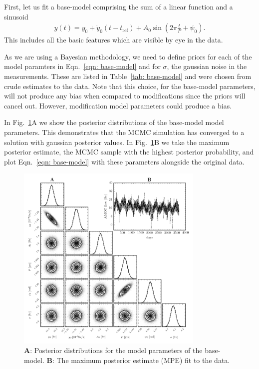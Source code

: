 \documentclass{article}
\newcommand{\tref}{t_{\textrm{ref}}}
\begin{document}
First, let us fit a base-model comprising the sum of a linear function and a
sinusoid
\begin{align}
y(t) = y_0 + \dot{y}_0(t - \tref) + A_0 \sin\left(2\pi \frac{t}{P} + \psi_0\right).
\label{eqn: base-model}
\end{align}
This includes all the basic features which are visible by eye in the data.

As we are using a Bayesian methodology, we need to define priors for each of
the model paramters in Eqn.~\eqref{eqn: base-model} and for $\sigma$, the
gaussian noise in the measurements. These are listed in Table~\ref{tab: base-model}
and were chosen from crude estimates to the data. Note that this choice, for the
base-model parameters, will not produce any bias when compared to modifications
since the priors will cancel out. However, modification model parameters could
produce a bias.
%

In Fig.~\ref{fig: base-model}A we show the posterior distributions of the
base-model model parameters. This demonstrates that the MCMC simulation has
converged to a solution with gaussian posterior values. In Fig.~\ref{fig: base-model}B
we take the maximum posterior estimate, the MCMC sample with the highest posterior
probability, and plot Eqn.~\eqref{eqn: base-model} with these parameters alongside
the original data.
\begin{figure}[htb]
\centering
\includegraphics[width=0.8\textwidth]{img/BasicSinusoid_PosteriorWithFit}
\caption{\textbf{A}: Posterior distributions for the model parameters of the
base-model. \textbf{B}: The maximum posterior estimate (MPE) fit to the data.}
\label{fig: base-model}
\end{figure}
\end{document}
